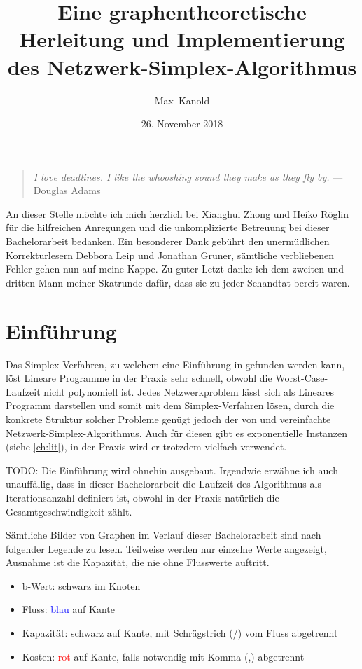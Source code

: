 \documentclass[11pt,a4paper,twoside,ngerman,openany,bibliography=totoc]{scrbook}
\author{Max~Kanold}
\date{26. November 2018}
\title{Eine graphentheoretische Herleitung und Implementierung des Netzwerk-Simplex-Algorithmus}
\theoremstyle{plain}
\theoremstyle{definition}
\begin{document}
\frontmatter
\maketitle
\null\vfill
\begin{quote}
    \emph{I love deadlines. I like the whooshing sound they make as they fly by.}
    \flushright --- Douglas Adams
\end{quote}
\vfill\vfill\vfill
An dieser Stelle möchte ich mich herzlich bei Xianghui Zhong und Heiko Röglin für die hilfreichen Anregungen und die unkomplizierte Betreuung bei dieser Bachelorarbeit bedanken. Ein besonderer Dank gebührt den unermüdlichen Korrekturlesern Debbora Leip und Jonathan Gruner, sämtliche verbliebenen Fehler gehen nun auf meine Kappe. Zu guter Letzt danke ich dem zweiten und dritten Mann meiner Skatrunde dafür, dass sie zu jeder Schandtat bereit waren.
\thispagestyle{empty}
\clearpage

\tableofcontents
\thispagestyle{empty}
\cleardoublepage

\mainmatter
\chapter{Einführung}
Das Simplex-Verfahren, zu welchem eine Einführung in \cite[Chvátal, 2002]{NSAbook} gefunden werden kann, löst Lineare Programme in der Praxis sehr schnell, obwohl die Worst-Case-Laufzeit nicht polynomiell ist. Jedes Netzwerkproblem lässt sich als Lineares Programm darstellen und somit mit dem Simplex-Verfahren lösen, durch die konkrete Struktur solcher Probleme genügt jedoch der von \cite[Dantzig, 1951]{erf1} und \cite[Orden, 1956]{erf2} vereinfachte Netzwerk-Simplex-Algorithmus. Auch für diesen gibt es exponentielle Instanzen (siehe \cref{ch:lit}), in der Praxis wird er trotzdem vielfach verwendet.

TODO: Die Einführung wird ohnehin ausgebaut. Irgendwie erwähne ich auch unauffällig, dass in dieser Bachelorarbeit die Laufzeit des Algorithmus als Iterationsanzahl definiert ist, obwohl in der Praxis natürlich die Gesamtgeschwindigkeit zählt.

Sämtliche Bilder von Graphen im Verlauf dieser Bachelorarbeit sind nach folgender Legende zu lesen. Teilweise werden nur einzelne Werte angezeigt, Ausnahme ist die Kapazität, die nie ohne Flusswerte auftritt.
\begin{itemize}\itemsep0em
    \item b-Wert: schwarz im Knoten
    \item Fluss: \textcolor{blue}{blau} auf Kante
    \item Kapazität: schwarz auf Kante, mit Schrägstrich (/) vom Fluss abgetrennt
    \item Kosten: \textcolor{red}{rot} auf Kante, falls notwendig mit Komma (,) abgetrennt
\end{itemize}
\end{document}
